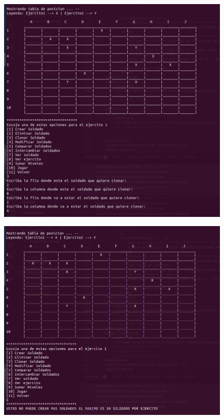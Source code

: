 \documentclass{article}
\begin{document}
	\begin{figure}[H]
		\centering
		\includegraphics[width=1.0\textwidth,keepaspectratio]{img/Commit6.png}
	\end{figure}
	\begin{figure}[H]
		\centering
		\includegraphics[width=1.0\textwidth,keepaspectratio]{img/Commit6.1.png}
	\end{figure}
\end{document}
